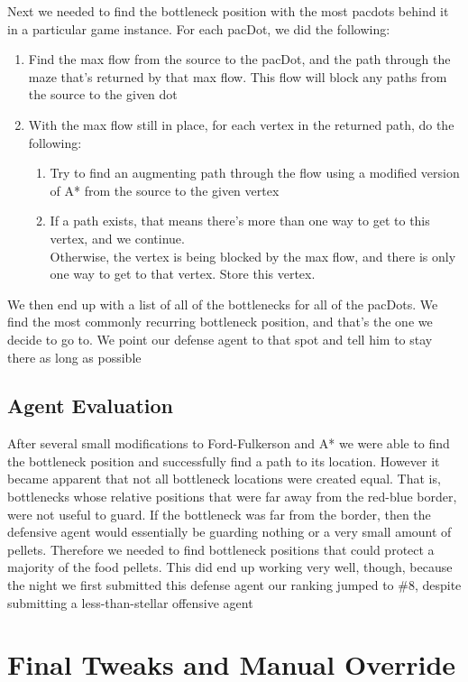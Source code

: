 \documentclass[11pt]{article}
\begin{document}
Next we needed to find the bottleneck position with the most pacdots behind it in a particular game instance.
For each pacDot, we did the following:
\begin{enumerate}
	\item Find the max flow from the source to the pacDot, and the path through the maze that's returned by that max flow.
	      This flow will block any paths from the source to the given dot
	\item With the max flow still in place, for each vertex in the returned path, do the following:
	\begin{enumerate}
		\item Try to find an augmenting path through the flow using a modified version of A* from the source to the given vertex
		\item If a path exists, that means there's more than one way to get to this vertex, and we continue.\\
		      Otherwise, the vertex is being blocked by the max flow, and there is only one way to get to that vertex. Store this vertex.
	\end{enumerate}
\end{enumerate}
We then end up with a list of all of the bottlenecks for all of the pacDots.
We find the most commonly recurring bottleneck position, and that's the one we decide to go to.
We point our defense agent to that spot and tell him to stay there as long as possible\

\subsection{Agent Evaluation}
After several small modifications to Ford-Fulkerson and A* we were able
to find the bottleneck position and successfully find a path to its location.
However it became apparent that not all bottleneck locations were created equal.
That is, bottlenecks whose relative positions that were far away from the red-blue
border, were not useful to guard. If the bottleneck was far from the border, then
the defensive agent would essentially be guarding nothing or a very small amount of pellets.
Therefore we needed to find bottleneck positions that could protect a majority of
the food pellets. This did end up working very well, though, because the night we first
submitted this defense agent our ranking jumped to \#8, despite submitting a
less-than-stellar offensive agent\

\section{Final Tweaks and Manual Override}
\end{document}
